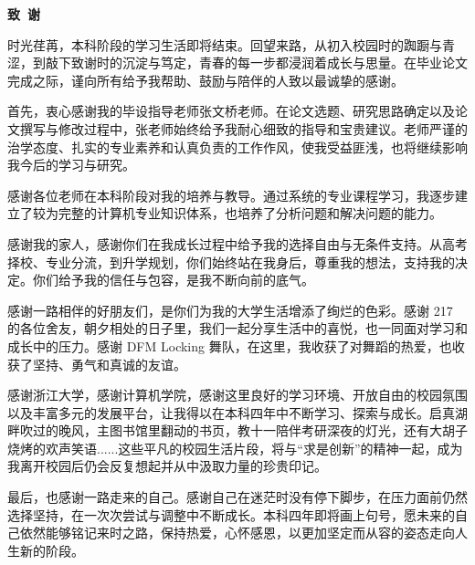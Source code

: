 \cleardoublepage{}
\begin{center}
    \bfseries {} 致~谢
\end{center}

时光荏苒，本科阶段的学习生活即将结束。回望来路，从初入校园时的踟蹰与青涩，到敲下致谢时的沉淀与笃定，青春的每一步都浸润着成长与思量。在毕业论文完成之际，谨向所有给予我帮助、鼓励与陪伴的人致以最诚挚的感谢。

首先，衷心感谢我的毕设指导老师张文桥老师。在论文选题、研究思路确定以及论文撰写与修改过程中，张老师始终给予我耐心细致的指导和宝贵建议。老师严谨的治学态度、扎实的专业素养和认真负责的工作作风，使我受益匪浅，也将继续影响我今后的学习与研究。

感谢各位老师在本科阶段对我的培养与教导。通过系统的专业课程学习，我逐步建立了较为完整的计算机专业知识体系，也培养了分析问题和解决问题的能力。

感谢我的家人，感谢你们在我成长过程中给予我的选择自由与无条件支持。从高考择校、专业分流，到升学规划，你们始终站在我身后，尊重我的想法，支持我的决定。你们给予我的信任与包容，是我不断向前的底气。

感谢一路相伴的好朋友们，是你们为我的大学生活增添了绚烂的色彩。感谢 217 的各位舍友，朝夕相处的日子里，我们一起分享生活中的喜悦，也一同面对学习和成长中的压力。感谢 DFM Locking 舞队，在这里，我收获了对舞蹈的热爱，也收获了坚持、勇气和真诚的友谊。

感谢浙江大学，感谢计算机学院，感谢这里良好的学习环境、开放自由的校园氛围以及丰富多元的发展平台，让我得以在本科四年中不断学习、探索与成长。启真湖畔吹过的晚风，主图书馆里翻动的书页，教十一陪伴考研深夜的灯光，还有大胡子烧烤的欢声笑语......这些平凡的校园生活片段，将与“求是创新”的精神一起，成为我离开校园后仍会反复想起并从中汲取力量的珍贵印记。

最后，也感谢一路走来的自己。感谢自己在迷茫时没有停下脚步，在压力面前仍然选择坚持，在一次次尝试与调整中不断成长。本科四年即将画上句号，愿未来的自己依然能够铭记来时之路，保持热爱，心怀感恩，以更加坚定而从容的姿态走向人生新的阶段。
